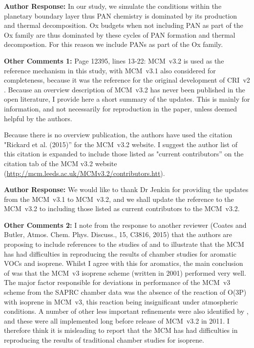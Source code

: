 \documentclass{article}
\begin{document}
\textbf{Author Response:} In our study, we simulate the conditions within the planetary boundary layer thus PAN chemistry is dominated by its production and thermal decomposition. Ox budgets when not including PAN as part of the Ox family are thus dominated by these cycles of PAN formation and thermal decompostion. For this reason we include PANs as part of the Ox family.

\textbf{Other Comments 1:} Page 12395, lines 13-22: MCM~v3.2 is used as the reference mechanism in this study, with MCM~v3.1 also considered for completeness, because it was the reference for the original development of CRI~v2 \citep{Jenkin:2008}. Because an overview description of MCM~v3.2 has never been published in the open literature, I provide here a short summary of the updates. This is mainly for information, and not necessarily for reproduction in the paper, unless deemed helpful by the authors.

Because there is no overview publication, the authors have used the citation "Rickard et al. (2015)'' for the MCM~v3.2 website. I suggest the author list of this citation is expanded to include those listed as "current contributors'' on the citation tab of the MCM v3.2 website (\url{http://mcm.leeds.ac.uk/MCMv3.2/contributors.htt}).

\textbf{Author Response:} We would like to thank Dr Jenkin for providing the updates from the MCM~v3.1 to MCM~v3.2, and we shall update the reference to the MCM~v3.2 to \citep{MCM_Site} including those listed as current contributors to the MCM~v3.2.

\textbf{Other Comments 2:} I note from the response to another reviewer (Coates and Butler, Atmos. Chem.  Phys. Discuss., 15, C3816, 2015) that the authors are proposing to include references to the studies of \citet{Bloss:2005} and \citet{Pinho:2005} to illustrate that the MCM has had difficulties in reproducing the results of chamber studies for aromatic VOCs and isoprene. Whilst I agree with this for aromatics, the main conclusion of \citet{Pinho:2005} was that the MCM~v3 isoprene scheme (written in 2001) performed very well. The major factor responsible for deviations in performance of the MCM~v3 scheme from the SAPRC chamber data was the absence of the reaction of O(3P) with isoprene in MCM~v3, this reaction being insignificant under atmospheric conditions. A number of other less important refinements were also identified by \citet{Pinho:2005}, and these were all implemented long before release of MCM~v3.2 in 2011. I therefore think it is misleading to report that the MCM has had difficulties in reproducing the results of traditional chamber studies for isoprene. 
\end{document}
